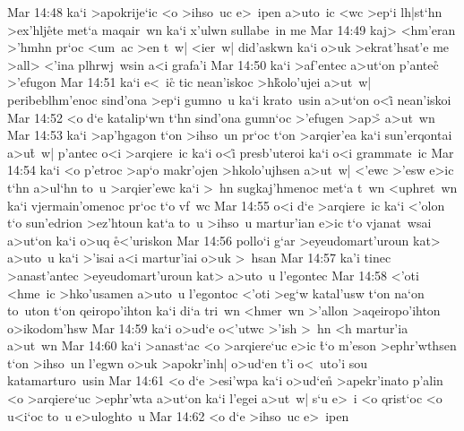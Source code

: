 \vs Mar 14:48
ka`i
>apokrije`ic
<o
>ihso~uc
e>~ipen
a>uto~ic
<wc
>ep`i
lh|st`hn
>ex'hlj\r{e}te
met`a
maqair~wn
ka`i
x'ulwn
sullabe~in
me\bibvsend
\vs Mar 14:49
kaj>
<hm'eran
>'hmhn
pr`oc
<um~ac
>en
t~w|
<ier~w|
did'askwn
ka`i
o>uk
>ekrat'hsat'e
me
>all>
<'ina
plhrwj~wsin
a<i
grafa'i\bibvsend
\vs Mar 14:50
ka`i
>af'entec
a>ut`on
p'antec\r{}
>'efugon\bibvsend
\vs Mar 14:51
ka`i
e<~ic\r{}
tic
nean'iskoc
>h\r{k}olo'ujei
a>ut~w|
peribeblhm'enoc
sind'ona
>ep`i
gumno~u
ka`i
krato~usin
a>ut`on
o<i\r{}
nean'iskoi\bibvsend
\vs Mar 14:52
<o
d`e
katalip`wn
t`hn
sind'ona
gumn`oc
>'efugen
>ap>\r{}
a>ut~wn\bibvsend
\vs Mar 14:53
ka`i
>ap'hgagon
t`on
>ihso~un
pr`oc
t`on
>arqier'ea
ka`i
sun'erqontai
a>u\r{t}~w|
p'antec
o<i
>arqiere~ic
ka`i
o<i\r{}
presb'uteroi
ka`i
o<i
grammate~ic\bibvsend
\vs Mar 14:54
ka`i
<o
p'etroc
>ap`o
makr'ojen
>hkolo'ujhsen
a>ut~w|
<'ewc
>'esw
e>ic
t`hn
a>ul`hn
to~u
>arqier'ewc
ka`i
>~hn
sugkaj'hmenoc
met`a
t~wn
<uphret~wn
ka`i
vjermain'omenoc
pr`oc
t`o
vf~wc\bibvsend
\vs Mar 14:55
o<i
d`e
>arqiere~ic
ka`i
<'olon
t`o
sun'edrion
>ez'htoun
kat`a
to~u
>ihso~u
martur'ian
e>ic
t`o
vjanat~wsai
a>ut`on
ka`i
o>uq
\r{e}<'uriskon\bibvsend
{}
\vs Mar 14:56
pollo`i
g`ar
>eyeudomart'uroun
kat>
a>uto~u
ka`i
>'isai
a<i
martur'iai
o>uk
>~hsan\bibvsend
\vs Mar 14:57
ka'i
tinec
>anast'antec
>eyeudomart'uroun
kat>
a>uto~u
l'egontec\bibvsend
\vs Mar 14:58
<'oti
<hme~ic
>hko'usamen
a>uto~u
l'egontoc
<'oti
>eg`w
katal'usw
t`on
na`on
to~uton
t`on
qeiropo'ihton
ka`i
di`a
tri~wn
<hmer~wn
>'allon
>aqeiropo'ihton
o>ikodom'hsw\bibvsend
\vs Mar 14:59
ka`i
o>ud`e
o<'utwc
>'ish
>~hn
<h
martur'ia
a>ut~wn\bibvsend
\vs Mar 14:60
ka`i
>anast`ac
<o
>arqiere`uc
e>ic
\r{t}`o
m'eson
>ephr'wthsen
t`on
>ihso~un
l'egwn
o>uk
>apokr'inh|
o>ud`en
t'i
o<~uto'i
sou
katamarturo~usin\bibvsend
\vs Mar 14:61
<o
d`e
>esi'wpa
ka`i
o>ud`en\r{}
>apekr'inato
p'alin
<o
>arqiere`uc
>ephr'wta
a>ut`on
ka`i
l'egei
a>ut~w|
s`u
e>~i
<o
qrist`oc
<o
u<i`oc
to~u
e>uloghto~u\bibvsend
\vs Mar 14:62
<o
d`e
>ihso~uc
e>~ipen
